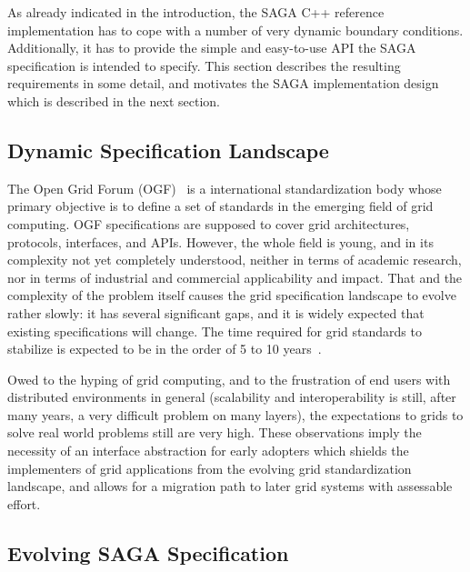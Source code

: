 
 As already indicated in the introduction, the SAGA C++ reference
 implementation has to cope with a number of very dynamic boundary
 conditions.  Additionally, it has to provide the simple and
 easy-to-use API the SAGA specification is intended to specify.  This
 section describes the resulting requirements in some detail, and
 motivates the SAGA implementation design which is described in the
 next section.

 \subsection{Dynamic Specification Landscape}
 \label{ssec:ogf}

   The Open Grid Forum (OGF)~\cite{ogf_website} is a international standardization
   body whose primary objective is to define a set of standards in the
   emerging field of grid computing.  OGF specifications are supposed
   to cover grid architectures, protocols, interfaces, and APIs.
   However, the whole field is young, and in its complexity not yet
   completely understood, neither in terms of academic research, nor
   in terms of industrial and commercial applicability and impact.
   That and the complexity of the problem itself causes the
   grid specification landscape to evolve rather slowly: it has
   several significant gaps, and it is widely expected that existing
   specifications will change.  The time required for grid standards
   to stabilize is expected to be in the order of 5 to 10 
   years~\cite{ogsa_roadmap}.

   Owed to the hyping of grid computing, and to the frustration of end
   users with distributed environments in general (scalability and
   interoperability is still, after many years, a very difficult
   problem on many layers), the expectations to grids to solve real
   world problems still are very high.  These observations imply the
   necessity of an interface abstraction for early adopters which
   shields the implementers of grid applications from the evolving
   grid standardization landscape, and allows for a migration path to
   later grid systems with assessable effort.  
   


 \subsection{Evolving SAGA Specification}

